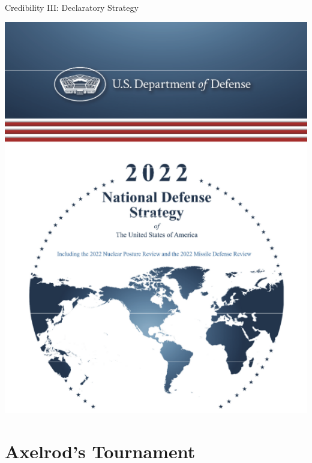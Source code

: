 \documentclass[pdf]{beamer}
\begin{document}
\begin{frame}{Credibility III: Declaratory Strategy}
  \begin{center}
    \includegraphics[scale=0.2]{npr_title_page_2022.png}
  \end{center}
\end{frame}

\section{Axelrod's Tournament}
\end{document}
